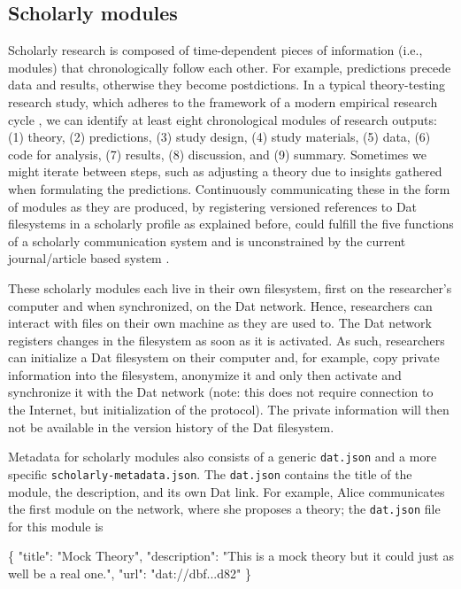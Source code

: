 \documentclass[publications,article,submit,moreauthors,pdftex,10pt,a4paper]{Definitions/mdpi}
\newenvironment{Shaded}{\begin{snugshade}}{\end{snugshade}}
\newcommand{\DataTypeTok}[1]{\textcolor[rgb]{0.13,0.29,0.53}{#1}}
\newcommand{\FunctionTok}[1]{\textcolor[rgb]{0.00,0.00,0.00}{#1}}
\newcommand{\StringTok}[1]{\textcolor[rgb]{0.31,0.60,0.02}{#1}}
\begin{document}
\subsection*{Scholarly modules}\label{scholarly-modules}

Scholarly research is composed of time-dependent pieces of information
(i.e., modules) that chronologically follow each other. For example,
predictions precede data and results, otherwise they become
postdictions. In a typical theory-testing research study, which adheres
to the framework of a modern empirical research cycle \citep{isbn:9789023228912}, we
can identify at least eight chronological modules of research outputs:
(1) theory, (2) predictions, (3) study design, (4) study materials, (5)
data, (6) code for analysis, (7) results, (8) discussion, and (9)
summary. Sometimes we might iterate between steps, such as adjusting a
theory due to insights gathered when formulating the predictions.
Continuously communicating these in the form of modules as they are
produced, by registering versioned references to Dat filesystems in a
scholarly profile as explained before, could fulfill the five functions
of a scholarly communication system and is unconstrained by the current
journal/article based system \citep[see also][]{doi:10.3390/publications6020021}.

These scholarly modules each live in their own filesystem, first on the
researcher's computer and when synchronized, on the Dat network. Hence,
researchers can interact with files on their own machine as they are
used to. The Dat network registers changes in the filesystem as soon as
it is activated. As such, researchers can initialize a Dat filesystem on
their computer and, for example, copy private information into the
filesystem, anonymize it and only then activate and synchronize it with
the Dat network (note: this does not require connection to the Internet,
but initialization of the protocol). The private information will then
not be available in the version history of the Dat filesystem.

Metadata for scholarly modules also consists of a generic
\texttt{dat.json} and a more specific \texttt{scholarly-metadata.json}.
The \texttt{dat.json} contains the title of the module, the description,
and its own Dat link. For example, Alice communicates the first module
on the network, where she proposes a theory; the \texttt{dat.json} file
for this module is


\begin{Shaded}
\begin{Highlighting}[]
\FunctionTok{\{}
  \DataTypeTok{"title"}\FunctionTok{:} \StringTok{"Mock Theory"}\FunctionTok{,}
  \DataTypeTok{"description"}\FunctionTok{:} \StringTok{"This is a mock theory but it could just as well be}
  \StringTok{a real one."}\FunctionTok{,}
  \DataTypeTok{"url"}\FunctionTok{:} \StringTok{"dat://dbf...d82"}
\FunctionTok{\}}
\end{Highlighting}
\end{Shaded}
\end{document}
